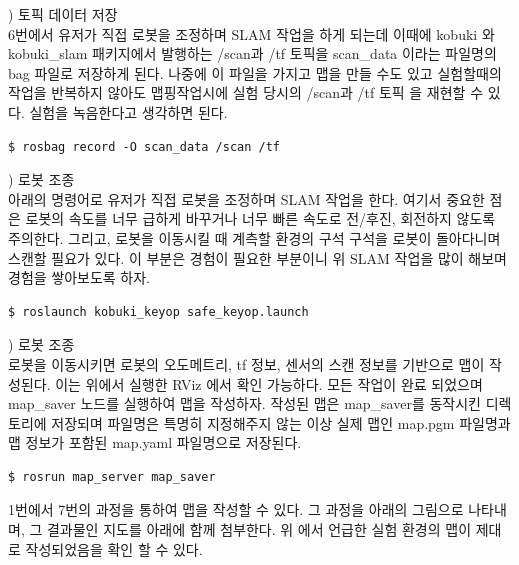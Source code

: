 \noindent
{}
\thenum) 토픽 데이터 저장\\
6번에서 유저가 직접 로봇을 조정하며 SLAM 작업을 하게 되는데 이때에 kobuki 와 kobuki\_slam 패키지에서 발행하는 /scan과 /tf 토픽을 scan\_data 이라는 파일명의 bag 파일로 저장하게 된다. 나중에 이 파일을 가지고 맵을 만들 수도 있고 실험할때의 작업을 반복하지 않아도 맵핑작업시에 실험 당시의 /scan과 /tf 토픽 을 재현할 수 있다. 실험을 녹음한다고 생각하면 된다.

\vspace{\baselineskip}
\begin{lstlisting}[language=ROS]
$ rosbag record -O scan_data /scan /tf
\end{lstlisting}

\vspace{\baselineskip}
\noindent
{}
\thenum) 로봇 조종\\
아래의 명령어로 유저가 직접 로봇을 조정하며 SLAM 작업을 한다. 여기서 중요한 점은 로봇의 속도를 너무 급하게 바꾸거나 너무 빠른 속도로 전/후진, 회전하지 않도록 주의한다. 그리고, 로봇을 이동시킬 때 계측할 환경의 구석 구석을 로봇이 돌아다니며 스캔할 필요가 있다. 이 부분은 경험이 필요한 부분이니 위 SLAM 작업을 많이 해보며 경험을 쌓아보도록 하자. 

\vspace{\baselineskip}
\begin{lstlisting}[language=ROS]
$ roslaunch kobuki_keyop safe_keyop.launch
\end{lstlisting}

\vspace{\baselineskip}
\noindent
{}
\thenum) 로봇 조종\\
로봇을 이동시키면 로봇의 오도메트리, tf 정보, 센서의 스캔 정보를 기반으로 맵이 작성된다. 이는 위에서 실행한 RViz 에서 확인 가능하다. 모든 작업이 완료 되었으며 map\_saver 노드를 실행하여 맵을 작성하자. 작성된 맵은 map\_saver를 동작시킨 디렉토리에 저장되며 파일명은 특명히 지정해주지 않는 이상 실제 맵인 map.pgm 파일명과 맵 정보가 포함된 map.yaml 파일명으로 저장된다.
\vspace{\baselineskip}
\begin{lstlisting}[language=ROS]
$ rosrun map_server map_saver
\end{lstlisting}

\noindent
1번에서 7번의 과정을 통하여 맵을 작성할 수 있다. 그 과정을 아래의 그림으로 나타내며, 그 결과물인 지도를 아래에 함께 첨부한다. 위 에서 언급한 실험 환경의 맵이 제대로 작성되었음을 확인 할 수 있다.


